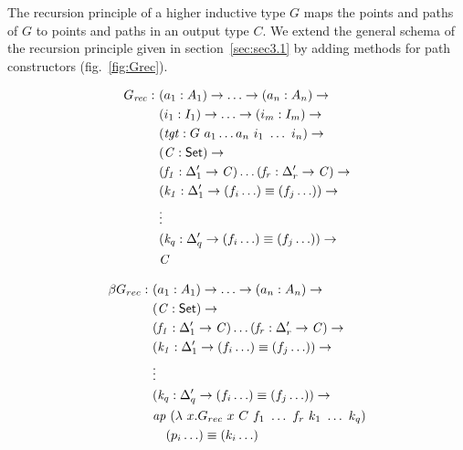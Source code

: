 \documentclass[runningheads]{llncs}
\begin{document}
The recursion principle of a higher inductive type $G$ maps the points and paths of $G$ to points and paths in an output type $C$. We extend the general schema of the recursion principle given in section~\ref{sec:sec3.1} by adding methods for path constructors (fig.~\ref{fig:Grec}).

\begin{figure}[t]
\centering
\begin{minipage}{.5\textwidth}
\centering
\fontsize{5.9pt}{2pt}\selectfont
\begin{align*}
G_{\mathit{rec}} :\ & (a_1 : A_1) \to \ldots \to (a_n : A_n) \to\\
& (i_1 : I_1) \to \ldots \to (i_m : I_m) \to\\
& (\mathit{tgt} : G\ a_1 \ldots a_n\ i_1\ \ldots\ i_n) \to\\
& (\mathit{C} : \textsf{Set}{}) \to \\
& (\mathit{f_1} : \Delta_1^\prime \to \mathit{C}) \ldots (\mathit{f_r} : \Delta_r^\prime \to \mathit{C}) \to \\
& (\mathit{k_1} : \Delta_1^\prime \to (f_i \ldots) \equiv (f_j \ldots)) \to \\
& \vdots \\
& (\mathit{k_q} : \Delta_q^\prime \to (f_i \ldots) \equiv (f_j \ldots)) \to \\
& \mathit{C}
\end{align*}
\label{fig:Grec}
\end{minipage}%
\begin{minipage}{.5\textwidth}
\centering
\fontsize{5.9pt}{2pt}\selectfont
\begin{align*}
\beta G_{rec} :\ & (a_1 : A_1) \to \ldots \to (a_n : A_n) \to\\
& (\mathit{C} : \SET{}) \to \\
& (\mathit{f_1} : \Delta_1^\prime \to \mathit{C}) \ldots (\mathit{f_r} : \Delta_r^\prime \to \mathit{C}) \to \\
& (\mathit{k_1} : \Delta_1^\prime \to (f_i \ldots) \equiv (f_j \ldots)) \to \\
& \vdots \\
& (\mathit{k_q} : \Delta_q^\prime \to (f_i \ldots) \equiv (f_j \ldots)) \to \\
& \mathit{ap} \  (\lambda \  x . G_{rec} \  x \  C \  f_1 \  \ldots\ f_r \  k_1 \ \ldots\  k_q)\\
& \hspace{0.25cm} \  (p_i \ldots) \equiv (k_i \ldots)
\end{align*}
{}
\label{fig:BGrec}
\end{minipage}
\end{figure}
\end{document}
